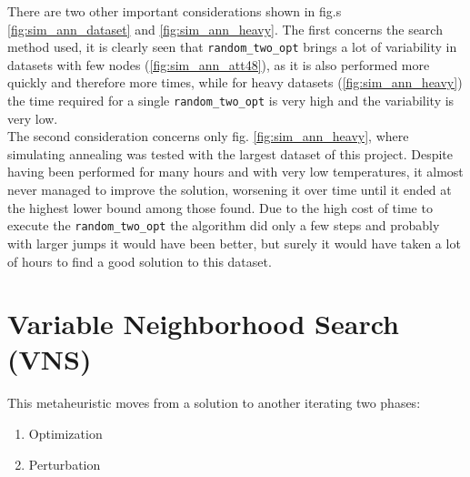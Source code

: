 There are two other important considerations shown in fig.s \ref{fig:sim_ann_dataset} and \ref{fig:sim_ann_heavy}. The first concerns the search method used, it is clearly seen that \texttt{random\_two\_opt} brings a lot of variability in datasets with few nodes (\ref{fig:sim_ann_att48}), as it is also performed more quickly and therefore more times, while for heavy datasets (\ref{fig:sim_ann_heavy}) the time required for a single \texttt{random\_two\_opt} is very high and the variability is very low. \\
The second consideration concerns only fig. \ref{fig:sim_ann_heavy}, where simulating annealing was tested with the largest dataset of this project. Despite having been performed for many hours and with very low temperatures, it almost never managed to improve the solution, worsening it over time until it ended at the highest lower bound among those found. Due to the high cost of time to execute the \texttt{random\_two\_opt} the algorithm did only a few steps and probably with larger jumps it would have been better, but surely it would have taken a lot of hours to find a good solution to this dataset.


\section{Variable Neighborhood Search (VNS)}

This metaheuristic moves from a solution to another iterating two phases:
\begin{enumerate}
	\item Optimization
	\item Perturbation
\end{enumerate}

